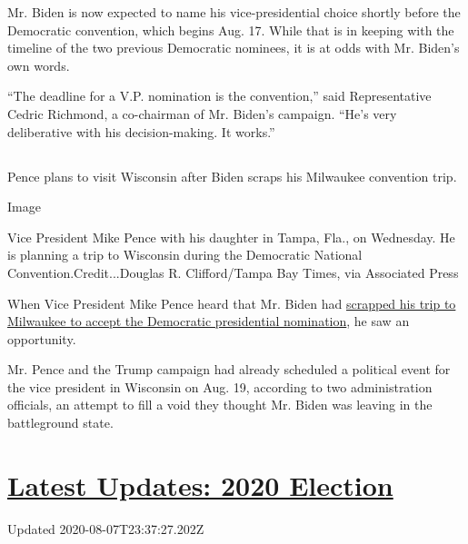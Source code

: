Mr. Biden is now expected to name his vice-presidential choice shortly
before the Democratic convention, which begins Aug. 17. While that is in
keeping with the timeline of the two previous Democratic nominees, it is
at odds with Mr. Biden's own words.

``The deadline for a V.P. nomination is the convention,'' said
Representative Cedric Richmond, a co-chairman of Mr. Biden's campaign.
``He's very deliberative with his decision-making. It works.''

\hypertarget{-3}{%
\subsection{}\label{-3}}

Pence plans to visit Wisconsin after Biden scraps his Milwaukee
convention trip.

Image

Vice President Mike Pence with his daughter in Tampa, Fla., on
Wednesday. He is planning a trip to Wisconsin during the Democratic
National Convention.Credit...Douglas R. Clifford/Tampa Bay Times, via
Associated Press

When Vice President Mike Pence heard that Mr. Biden had
\href{https://www.nytimes3xbfgragh.onion/2020/08/05/us/politics/joe-biden-milwaukee.html}{scrapped
his trip to Milwaukee to accept the Democratic presidential nomination},
he saw an opportunity.

Mr. Pence and the Trump campaign had already scheduled a political event
for the vice president in Wisconsin on Aug. 19, according to two
administration officials, an attempt to fill a void they thought Mr.
Biden was leaving in the battleground state.

\hypertarget{latest-updates-2020-election}{%
\section{\texorpdfstring{\href{https://www.nytimes3xbfgragh.onion/2020/08/07/us/elections/trump-biden.html?action=click\&pgtype=Article\&state=default\&region=MAIN_CONTENT_1\&context=storylines_live_updates}{Latest
Updates: 2020
Election}}{Latest Updates: 2020 Election}}\label{latest-updates-2020-election}}

Updated 2020-08-07T23:37:27.202Z

